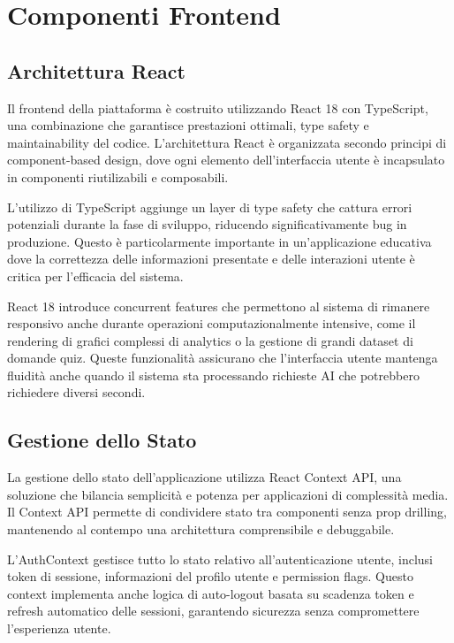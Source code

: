 \documentclass[12pt,a4paper]{article}
\begin{document}
\section{Componenti Frontend}

\subsection{Architettura React}

Il frontend della piattaforma è costruito utilizzando React 18 con TypeScript, una combinazione che garantisce prestazioni ottimali, type safety e maintainability del codice. L'architettura React è organizzata secondo principi di component-based design, dove ogni elemento dell'interfaccia utente è incapsulato in componenti riutilizabili e composabili.

L'utilizzo di TypeScript aggiunge un layer di type safety che cattura errori potenziali durante la fase di sviluppo, riducendo significativamente bug in produzione. Questo è particolarmente importante in un'applicazione educativa dove la correttezza delle informazioni presentate e delle interazioni utente è critica per l'efficacia del sistema.

React 18 introduce concurrent features che permettono al sistema di rimanere responsivo anche durante operazioni computazionalmente intensive, come il rendering di grafici complessi di analytics o la gestione di grandi dataset di domande quiz. Queste funzionalità assicurano che l'interfaccia utente mantenga fluidità anche quando il sistema sta processando richieste AI che potrebbero richiedere diversi secondi.

\subsection{Gestione dello Stato}

La gestione dello stato dell'applicazione utilizza React Context API, una soluzione che bilancia semplicità e potenza per applicazioni di complessità media. Il Context API permette di condividere stato tra componenti senza prop drilling, mantenendo al contempo una architettura comprensibile e debuggabile.

L'AuthContext gestisce tutto lo stato relativo all'autenticazione utente, inclusi token di sessione, informazioni del profilo utente e permission flags. Questo context implementa anche logica di auto-logout basata su scadenza token e refresh automatico delle sessioni, garantendo sicurezza senza compromettere l'esperienza utente.
\end{document}
